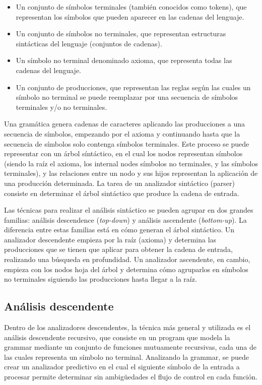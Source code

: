 \begin{itemize}
    \item Un conjunto de símbolos terminales (también conocidos como
    \glspl{token}), que representan los símbolos que pueden aparecer en las
    cadenas del lenguaje.
    \item Un conjunto de símbolos no terminales, que representan estructuras
    sintácticas del lenguaje (conjuntos de cadenas).
    \item Un símbolo no terminal denominado axioma, que representa todas las
    cadenas del lenguaje.
    \item Un conjunto de producciones, que representan las reglas según las
    cuales un símbolo no terminal se puede reemplazar por una secuencia de
    símbolos terminales y/o no terminales.
\end{itemize}

Una gramática genera cadenas de caracteres aplicando las producciones a una
secuencia de símbolos, empezando por el axioma y continuando hasta que la
secuencia de símbolos solo contenga símbolos terminales. Este proceso se puede
representar con un árbol síntáctico, en el cual los nodos representan símbolos
(siendo la raíz el axioma, los \glspl{internal node} símbolos no terminales, y
las  símbolos terminales), y las relaciones entre un
nodo y sus hijos representan la aplicación de una producción determinada. La
tarea de un analizador sintáctico (\gls{parser}) consiste en determinar el árbol
sintáctico que produce la cadena de entrada. \parencite{dragon-book}

Las técnicas para realizar el análisis sintáctico se pueden agrupar en dos
grandes familias: análisis descendence (\textit{top-down}) y análisis ascendente
(\textit{bottom-up}). La diferencia entre estas familias está en cómo generan el
árbol sintáctico. Un analizador descendente empieza por la raíz (axioma) y
determina las producciones que se tienen que aplicar para obtener la cadena de
entrada, realizando una búsqueda en profundidad. Un analizador ascendente, en
cambio, empieza con los nodos hoja del árbol y determina cómo agruparlos en
símbolos no terminales siguiendo las producciones hasta llegar a la raíz.
\parencite{dragon-book}

\subsection{Análisis descendente}

Dentro de los analizadores descendentes, la técnica más general y utilizada es
el análisis descendente recursivo, que consiste en un \gls{program} que modela la
\gls{grammar} mediante un conjunto de funciones mutuamente recursivas, cada una
de las cuales representa un símbolo no terminal. Analizando la \gls{grammar}, se
puede crear un analizador predictivo en el cual el siguiente símbolo de la
entrada a procesar permite determinar sin ambigüedades el flujo de control en
cada función. \parencite{dragon-book}

